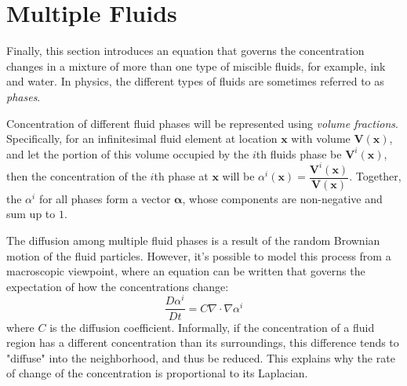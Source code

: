 \section{Multiple Fluids}
\label{section multiple fluids}
Finally, this section introduces an equation that governs the concentration changes in a mixture of more than one type of miscible fluids, for example, ink and water. In physics, the different types of fluids are sometimes referred to as \textit{phases}.

Concentration of different fluid phases will be represented using \textit{volume fractions}. Specifically, for an infinitesimal fluid element at location $\textbf{x}$ with volume $\textbf{V}(\textbf{x})$, and let the portion of this volume occupied by the $i$th fluids phase be $\textbf{V}^i(\textbf{x})$, then the concentration of the $i$th phase at $\textbf{x}$ will be $\alpha^i(\textbf{x}) = \dfrac{\textbf{V}^i(\textbf{x})}{\textbf{V}(\textbf{x})}$. Together, the $\alpha^i$ for all phases form a vector $\bm{\alpha}$, whose components are non-negative and sum up to $1$.

The diffusion among multiple fluid phases is a result of the random Brownian motion of the fluid particles. However, it's possible to model this process from a macroscopic viewpoint, where an equation can be written that governs the expectation of how the concentrations change:
\begin{equation}
    \tag{Advection-Diffusion Equation}
    \frac{D \alpha^i}{D t} = C\nabla \cdot \nabla \alpha^i
\end{equation}
where $C$ is the diffusion coefficient. Informally, if the concentration of a fluid region has a different concentration than its surroundings, this difference tends to "diffuse" into the neighborhood, and thus be reduced. This explains why the rate of change of the concentration is proportional to its Laplacian.